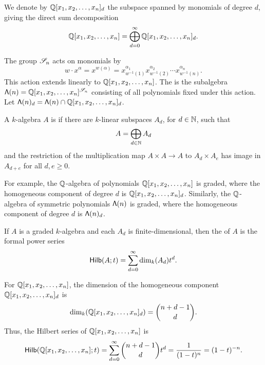 We denote by \(\mathbb{Q}[x_1, x_2, \ldots, x_n]_d\) the subspace spanned by monomials of degree \(d\), giving the direct sum decomposition
\begin{equation}
    \mathbb{Q}[x_1, x_2, \ldots, x_n] = \bigoplus_{d=0}^\infty \mathbb{Q}[x_1, x_2, \ldots, x_n]_d.
\end{equation}

The group \(\mathscr{S}_{n}\) acts on monomials by
\begin{equation}
    w \cdot x^\alpha = x^{w(\alpha)} = x_{w^{-1}(1)}^{\alpha_1}x_{w^{-1}(2)}^{\alpha_2}\cdots x_{w^{-1}(n)}^{\alpha_n}.
\end{equation}
This action extends linearly to \(\mathbb{Q}[x_1, x_2, \ldots, x_n]\).
The  is the subalgebra \(\operatorname{\mathsf{\Lambda}}(n) = \mathbb{Q}[x_1, x_2, \ldots, x_n]^{\mathscr{S}_{n}}\) consisting of all polynomials fixed under this action.
Let \(\operatorname{\mathsf{\Lambda}}(n)_d = \operatorname{\mathsf{\Lambda}}(n) \cap \mathbb{Q}[x_1, x_2, \ldots, x_n]_d\).

A \(k\)-algebra \(A\) is  if
there are \(k\)-linear subspaces \(A_d\), for \(d \in \mathbb{N}\),
such that
\begin{equation*}
    A = \bigoplus_{d \in \mathbb{N}} A_d
\end{equation*}
and the restriction of the multiplication map \(A \times A \to A\) to \(A_d \times A_e\) has image in \(A_{d+e}\) for all \(d, e \geq 0\).

For example, the \(\mathbb{Q}\)-algebra of polynomials \(\mathbb{Q}[x_1, x_2, \ldots, x_n]\) is graded, where the homogeneous component of degree \(d\) is \(\mathbb{Q}[x_1, x_2, \ldots, x_n]_d\).
Similarly, the \(\mathbb{Q}\)-algebra of symmetric polynomials \(\operatorname{\mathsf{\Lambda}}(n)\) is graded, where the homogeneous component of degree \(d\) is \(\operatorname{\mathsf{\Lambda}}(n)_d\).

If \(A\) is a graded \(k\)-algebra and each \(A_d\) is finite-dimensional,
then the  of \(A\) is the formal power series
\begin{equation*}
    \operatorname{\mathsf{Hilb}}(A; t) = \sum_{d=0}^\infty \dim_k(A_d)t^d.
\end{equation*}

For \(\mathbb{Q}[x_1, x_2, \ldots, x_n]\),
the dimension of the homogeneous component \(\mathbb{Q}[x_1, x_2, \ldots, x_n]_d\) is
\begin{equation*}
    \dim_k(\mathbb{Q}[x_1, x_2, \ldots, x_n]_d) = \binom{n+d-1}{d}.
\end{equation*}
Thus, the Hilbert series of \(\mathbb{Q}[x_1, x_2, \ldots, x_n]\) is
\begin{equation*}
    \operatorname{\mathsf{Hilb}}(\mathbb{Q}[x_1, x_2, \ldots, x_n]; t) = \sum_{d=0}^\infty \binom{n+d-1}{d}t^d = \frac{1}{(1-t)^n} = (1-t)^{-n}.
\end{equation*}

